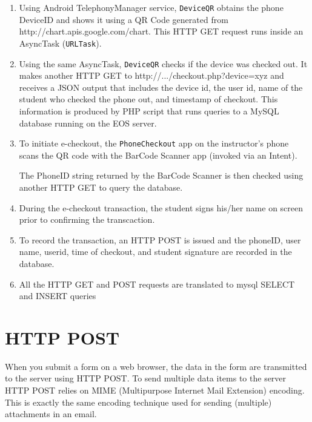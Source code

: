 \documentclass[11pt]{article} %
\begin{document}
\begin{enumerate}
\item Using Android TelephonyManager service, \texttt{DeviceQR}
obtains the phone DeviceID and shows it using a QR Code generated from
http://chart.apis.google.com/chart. This HTTP GET request runs inside
an AsyncTask (\texttt{URLTask}).


\item Using the same AsyncTask, \texttt{DeviceQR} checks if the device
was checked out. It makes another HTTP GET to
http://.../checkout.php?device=xyz and receives a JSON output that
includes the device id, the user id, name of the student who checked
the phone out, and timestamp of checkout. This information is produced
by PHP script that runs queries to a MySQL database running on the EOS
server.


\item To initiate e-checkout, the \texttt{PhoneCheckout} app 
on the instructor's phone scans the QR code with the BarCode Scanner
app (invoked via an Intent). 


The PhoneID string returned by the
BarCode Scanner is then checked using another HTTP GET to query the
database.


\item During the e-checkout transaction, the student signs his/her
name on screen prior to confirming the transcaction.
\item To record the transaction, an HTTP POST is issued and the
phoneID, user name, userid, time of checkout, and student signature
are recorded in the database.

\item All the HTTP GET and POST requests are translated to mysql SELECT and
   INSERT queries
\end{enumerate}

\section{HTTP POST}
When you submit a form on a web browser, the data in the form are transmitted
to the server using HTTP POST. To send multiple data items to the server
HTTP POST relies on MIME (Multipurpose Internet Mail Extension) encoding.
This is exactly the same encoding technique used for sending 
(multiple) attachments in an email.
\end{document}
